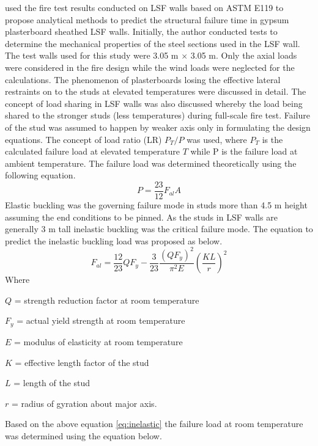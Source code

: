 \citet{Klippstein1978} used the fire test results conducted on LSF walls based on ASTM E119 to propose analytical methods to predict the structural failure time in gypsum plasterboard sheathed LSF walls. Initially, the author conducted tests to determine the mechanical properties of the steel sections used in the LSF wall. The test walls used for this study were 3.05 m $\times$ 3.05 m. Only the axial loads were considered in the fire design while the wind loads were neglected for the calculations. The phenomenon of plasterboards losing the effective lateral restraints on to the studs at elevated temperatures were discussed in detail. The concept of load sharing in LSF walls was also discussed whereby the load being shared to the stronger studs (less temperatures) during full-scale fire test. Failure of the stud was assumed to happen by weaker axis only in formulating the design equations. The concept of load ratio (LR) $P_T/P$ was used, where $P_T$ is the calculated failure load at elevated temperature $T$ while P is the failure load at ambient temperature. The failure load was determined theoretically using the following equation.
\begin{equation}
	P = \dfrac{23}{12} F_{al}A
\end{equation}
Elastic buckling was the governing failure mode in studs more than 4.5 m height assuming the end conditions to be pinned. As the studs in LSF walls are generally 3 m tall inelastic buckling was the critical failure mode. The equation to predict the inelastic buckling load was proposed as below. 
\begin{equation}\label{eq:inelastic}
	F_{al} = \dfrac{12}{23} QF_y-\dfrac{3}{23}\dfrac{(QF_y)^2}{\pi^2E}\left(\dfrac{KL}{r}\right)^2 	
\end{equation}
Where
\begin{description}[itemsep=0pt,parsep=0pt]
	\item $Q$ = strength reduction factor at room temperature
	\item $F_y$ = actual yield strength at room temperature
	\item $E$ = modulus of elasticity at room temperature
	\item $K$ = effective length factor of the stud
	\item $L$ = length of the stud
	\item $r$ = radius of gyration about major axis.
\end{description}	
Based on the above equation \cref{eq:inelastic} the failure load at room temperature was determined using the equation below.
